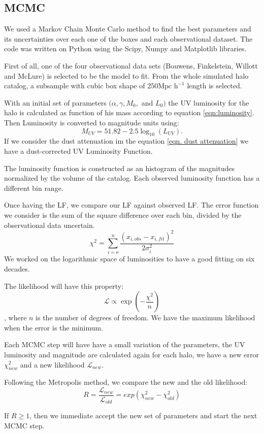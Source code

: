 \documentclass{emulateapj}
\begin{document}
\subsection{MCMC}
We used a Markov Chain Monte Carlo method to find the best parameters and its 
uncertainties over each one of the boxes and each observational dataset. The code was written
on Python using the Scipy, Numpy and Matplotlib libraries.

First of all, one of the four observational data sets (Bouwens, Finkelstein, Willott and McLure) 
is selected to be the model to fit.
From the whole simulated halo catalog, a subsample with cubic box shape of 
 $250\textrm{Mpc h}^{-1}$ length is selected. 
 
With an initial set of parameters $(\alpha, \gamma, M_0,$ and $ L_0)$ the UV luminosity
for the halo is calculated as function of his mass according to equation
 \ref{eqn:luminosity}. Then Luminosity is converted to magnitude units using:
  \[ M_{UV} = 51.82 - 2.5 \log_{10}(L_{UV}). \]
If we consider the dust attenuation im the equation \ref{eqn. dust attenuation} we have
a dust-corrected UV Luminosity Function.

The luminosity function is constructed as an histogram of the magnitudes normalized by 
the volume of the catalog. Each observed luminosity function has a different bin range.

Once having the LF, we compare our LF against observed LF. The error function we consider
is the sum of the square difference over each bin, divided by the observational data uncertain.
\[ \chi^2  = \sum_{i=o}^{n} \frac {\left( x_{i,obs} - x_{i,fit} \right)^2 }{2\sigma_i^2}\]
We worked on the logarithmic space of luminosities to have a good fitting on
six decades.

The likelihood will have this property:
\[ \mathcal{L} \propto \exp \left(  -\frac{\chi ^2}{n} \right) \], where $n$ is the number of degrees
of freedom. We have the maximum likelihood when the error is the minimum.

Each MCMC step will have have a small variation of the parameters, the UV luminosity and magnitude are 
calculated again for each halo, we have a new error $\chi_{new}^2$ and a new likelihood 
$ \mathcal{L}_{new} $.

Following the Metropolis method, we compare the new and the old likelihood:
\[ R =\frac{ \mathcal{L}_{new}  }{ \mathcal{L}_{old} }  = 
exp( \chi_{new}^2 - \chi_{old}^2 )
\]

If $  R \geq 1$, then we immediate accept the new set of parameters and start the next MCMC step.
\end{document}
